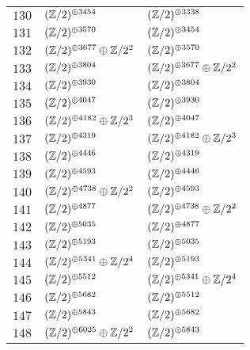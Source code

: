 \begin{supertabular}{|c|p{5.5cm}|p{5.5cm}|}
$130$%
&$(\mathbb{Z}/2)^{\oplus3454}$%
&$(\mathbb{Z}/2)^{\oplus3338}$\\

$131$%
&$(\mathbb{Z}/2)^{\oplus3570}$%
&$(\mathbb{Z}/2)^{\oplus3454}$\\

$132$%
&$(\mathbb{Z}/2)^{\oplus3677}\oplus\mathbb{Z}/2^{2}$%
&$(\mathbb{Z}/2)^{\oplus3570}$\\

$133$%
&$(\mathbb{Z}/2)^{\oplus3804}$%
&$(\mathbb{Z}/2)^{\oplus3677}\oplus\mathbb{Z}/2^{2}$\\

$134$%
&$(\mathbb{Z}/2)^{\oplus3930}$%
&$(\mathbb{Z}/2)^{\oplus3804}$\\

$135$%
&$(\mathbb{Z}/2)^{\oplus4047}$%
&$(\mathbb{Z}/2)^{\oplus3930}$\\

$136$%
&$(\mathbb{Z}/2)^{\oplus4182}\oplus\mathbb{Z}/2^{3}$%
&$(\mathbb{Z}/2)^{\oplus4047}$\\

$137$%
&$(\mathbb{Z}/2)^{\oplus4319}$%
&$(\mathbb{Z}/2)^{\oplus4182}\oplus\mathbb{Z}/2^{3}$\\

$138$%
&$(\mathbb{Z}/2)^{\oplus4446}$%
&$(\mathbb{Z}/2)^{\oplus4319}$\\

$139$%
&$(\mathbb{Z}/2)^{\oplus4593}$%
&$(\mathbb{Z}/2)^{\oplus4446}$\\

$140$%
&$(\mathbb{Z}/2)^{\oplus4738}\oplus\mathbb{Z}/2^{2}$%
&$(\mathbb{Z}/2)^{\oplus4593}$\\

$141$%
&$(\mathbb{Z}/2)^{\oplus4877}$%
&$(\mathbb{Z}/2)^{\oplus4738}\oplus\mathbb{Z}/2^{2}$\\

$142$%
&$(\mathbb{Z}/2)^{\oplus5035}$%
&$(\mathbb{Z}/2)^{\oplus4877}$\\

$143$%
&$(\mathbb{Z}/2)^{\oplus5193}$%
&$(\mathbb{Z}/2)^{\oplus5035}$\\

$144$%
&$(\mathbb{Z}/2)^{\oplus5341}\oplus\mathbb{Z}/2^{4}$%
&$(\mathbb{Z}/2)^{\oplus5193}$\\

$145$%
&$(\mathbb{Z}/2)^{\oplus5512}$%
&$(\mathbb{Z}/2)^{\oplus5341}\oplus\mathbb{Z}/2^{4}$\\

$146$%
&$(\mathbb{Z}/2)^{\oplus5682}$%
&$(\mathbb{Z}/2)^{\oplus5512}$\\

$147$%
&$(\mathbb{Z}/2)^{\oplus5843}$%
&$(\mathbb{Z}/2)^{\oplus5682}$\\

$148$%
&$(\mathbb{Z}/2)^{\oplus6025}\oplus\mathbb{Z}/2^{2}$%
&$(\mathbb{Z}/2)^{\oplus5843}$\\


\end{supertabular}
